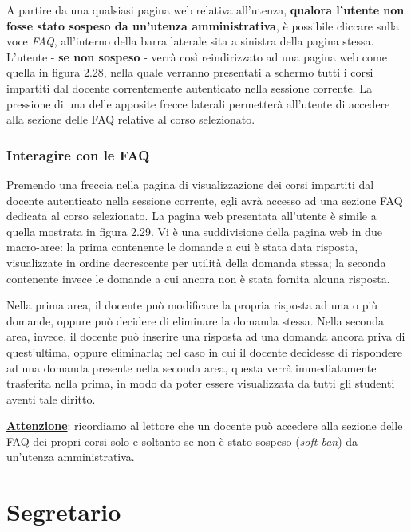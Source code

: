 \documentclass [a4paper,11pt]{book}
\begin{document}
A partire da una qualsiasi pagina web relativa all'utenza, \textbf{qualora l'utente non fosse stato sospeso da un'utenza amministrativa}, è possibile cliccare sulla voce \emph{FAQ}, all'interno della barra laterale sita a sinistra della pagina stessa. L'utente - \textbf{se non sospeso} - verrà così reindirizzato ad una pagina web come quella in figura 2.28, nella quale verranno presentati a schermo tutti i corsi impartiti dal docente correntemente autenticato nella sessione corrente. La pressione di una delle apposite frecce laterali permetterà all'utente di accedere alla sezione delle FAQ relative al corso selezionato.


\medskip

\subsubsection{Interagire con le FAQ}

Premendo una freccia nella pagina di visualizzazione dei corsi impartiti dal docente autenticato nella sessione corrente, egli avrà accesso ad una sezione FAQ dedicata al corso selezionato. La pagina web presentata all'utente è simile a quella mostrata in figura 2.29. Vi è una suddivisione della pagina web in due macro-aree: la prima contenente le domande a cui è stata data risposta, visualizzate in ordine decrescente per utilità della domanda stessa; la seconda contenente invece le domande a cui ancora non è stata fornita alcuna risposta. 


Nella prima area, il docente può modificare la propria risposta ad una o più domande, oppure può decidere di eliminare la domanda stessa. Nella seconda area, invece, il docente può inserire una risposta ad una domanda ancora priva di quest'ultima, oppure eliminarla; nel caso in cui il docente decidesse di rispondere ad una domanda presente nella seconda area, questa verrà immediatamente trasferita nella prima, in modo da poter essere visualizzata da tutti gli studenti aventi tale diritto.

\textbf{\underline{Attenzione}}: ricordiamo al lettore che un docente può accedere alla sezione delle FAQ dei propri corsi solo e soltanto se non è stato sospeso (\emph{soft ban}) da un'utenza amministrativa.

\medskip
\medskip

\section{Segretario}
\end{document}
